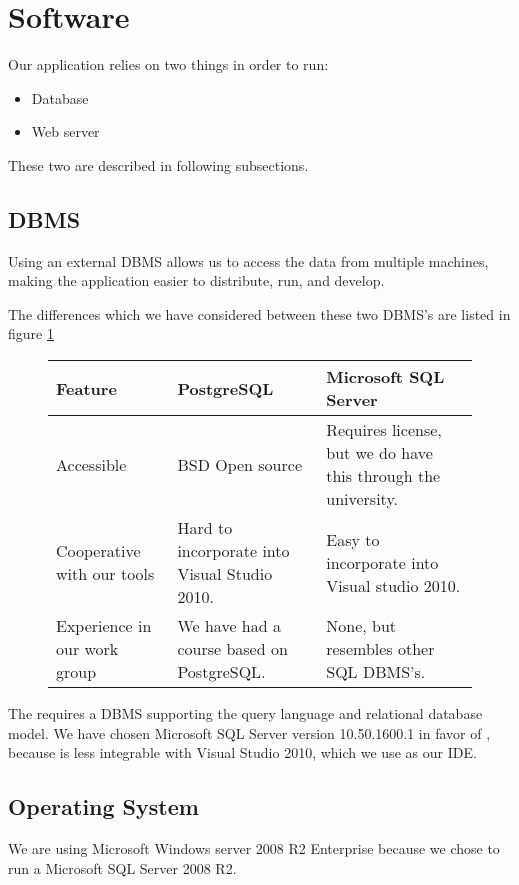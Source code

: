 \section{Software}
\label{sec:software}

Our application relies on two things in order to run:

\begin{itemize}
	\item Database
	\item Web server
\end{itemize}

These two are described in following subsections.

\subsection{DBMS}
\label{subsec:dbms}

Using an external DBMS allows us to access the data from multiple machines, making the application easier to distribute, run, and develop.

The differences which we have considered between these two DBMS's are listed in figure \ref{fig:DBMS}\cite{postgres08}

\begin{figure}[htb]
	\centering
		\begin{tabularx}{\textwidth}{L|L|L}
			\textbf{Feature}&\textbf{PostgreSQL}&\textbf{Microsoft SQL Server} \\
			\hline
			Accessible&BSD Open source&Requires license, but we do have this through the university. \\ 
			Cooperative with our tools&Hard to incorporate into Visual Studio 2010. & Easy to incorporate into Visual studio 2010. \\ 
			Experience in our work group&We have had a course based on PostgreSQL. & None, but resembles other SQL DBMS's. \\ 
		\end{tabularx}
	\label{fig:DBMS}
\end{figure}

The \hdesk requires a DBMS supporting the query language \sql[] and relational database model\cite{Sudershan2011}.
We have chosen Microsoft SQL Server version 10.50.1600.1 in favor of \posgresql[], because \posgresql[] is less integrable with Visual Studio 2010, which we use as our IDE.

\subsection{Operating System}
\label{subsec:operating_system}
We are using Microsoft Windows server 2008 R2 Enterprise because we chose to run a Microsoft SQL Server 2008 R2. 

